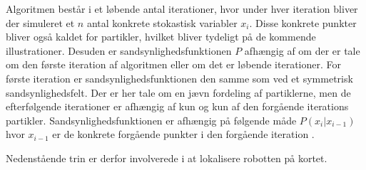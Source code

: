 \documentclass[../../SRP.tex]{subfiles}
\begin{document}
Algoritmen består i et løbende antal iterationer, hvor under hver iteration bliver der simuleret et $n$ antal konkrete stokastisk variabler $x_i$. Disse konkrete punkter bliver også kaldet for partikler, hvilket bliver tydeligt på de kommende illustrationer. Desuden er sandsynlighedsfunktionen $P$ afhængig af om der er tale om den første iteration af algoritmen eller om det er løbende iterationer. For første iteration er sandsynlighedsfunktionen den samme som ved et symmetrisk sandsynlighedsfelt. Der er her tale om en jævn fordeling af partiklerne, men de efterfølgende iterationer er afhængig af kun og kun af den forgående iterations partikler. Sandsynlighedsfunktionen er afhængig på følgende måde $P(x_i|x_{i-1})$ hvor $x_{i-1}$ er de konkrete forgående punkter i den forgående iteration \cite{ML}.

Nedenstående trin er derfor involverede i at lokalisere robotten på kortet.
\end{document}
